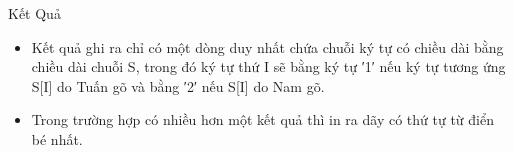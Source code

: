 Kết Quả  
\begin{itemize}
	\item     Kết quả ghi ra chỉ có một dòng duy nhất chứa chuỗi ký tự có chiều dài bằng chiều dài chuỗi S, trong đó ký tự thứ I sẽ bằng ký tự ′1′ nếu ký tự tương ứng S[I] do Tuấn gõ và bằng ′2′ nếu S[I] do Nam gõ.   
	\item     Trong trường hợp có nhiều hơn một kết quả thì in ra dãy có thứ tự từ điển bé nhất.   
\end{itemize}